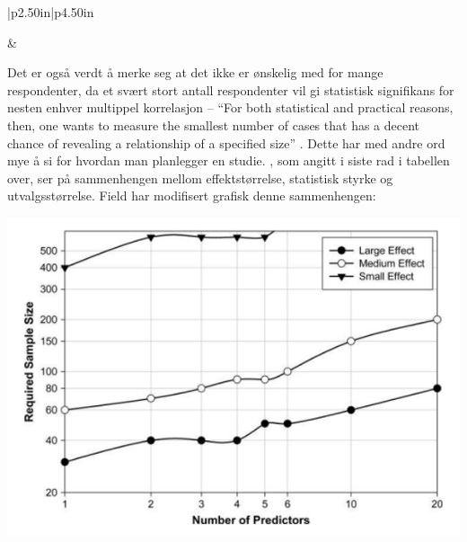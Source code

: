 \documentclass[
]{article}
\begin{document}
\begin{longtable}[c]{|p{2.50in}|p{4.50in}}



 &  \\




\end{longtable}

Det er også verdt å merke seg at det ikke er ønskelig med for mange respondenter, da et svært stort antall respondenter vil gi statistisk signifikans for nesten enhver multippel korrelasjon -- ``For both statistical and practical reasons, then, one wants to measure the smallest number of cases that has a decent chance of revealing a relationship of a specified size'' \citep[s.123]{tabachnikUsingMultivariateStatistics2007}. Dette har med andre ord mye å si for hvordan man planlegger en studie. \citet{milesApplyingRegressionCorrelation2001}, som angitt i siste rad i tabellen over, ser på sammenhengen mellom effektstørrelse, statistisk styrke og utvalgsstørrelse. Field \citeyearpar[s.223, figur 7.10]{fieldDiscoveringStatisticsUsing2009} har modifisert grafisk denne sammenhengen:

\includegraphics{Field_s223.png}
\end{document}
